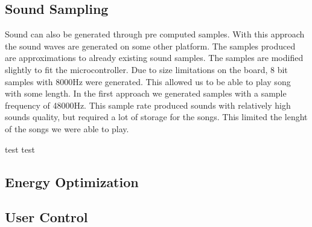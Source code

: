 



\subsection{Sound Sampling}
Sound can also be generated through pre computed samples. With this approach the sound waves are generated on some other platform. The samples produced are approximations to already existing sound samples. The samples are modified slightly to fit the microcontroller. Due to size limitations on the board, 8 bit samples with 8000Hz were generated. This allowed us to be able to play song with some length. In the first approach we generated samples with a sample frequency of 48000Hz. This sample rate produced sounds with relatively high sounds quality, but required a lot of storage for the songs. This limited the lenght of the songs we were able to play. 

test test
 


\subsection{Energy Optimization}





\subsection{User Control}












